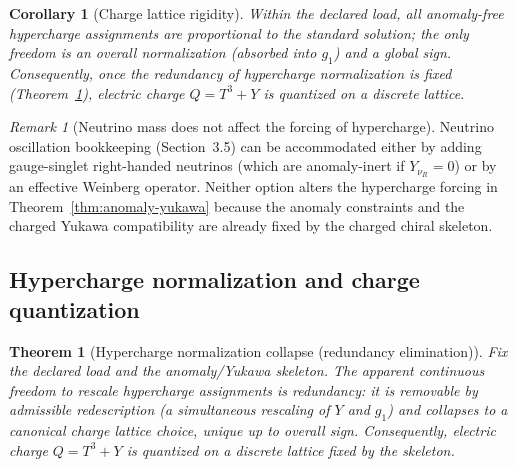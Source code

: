 \documentclass[11pt]{article}
\newtheorem{theorem}[definition]{Theorem}
\newtheorem{corollary}[definition]{Corollary}
\theoremstyle{remark}
\newtheorem{remark}[definition]{Remark}
\begin{document}
\begin{corollary}[Charge lattice rigidity]\label{cor:charge-lattice}
Within the declared load, all anomaly-free hypercharge assignments are proportional to the standard
solution; the only freedom is an overall normalization (absorbed into $g_1$) and a global sign.
Consequently, once the redundancy of hypercharge normalization is fixed (Theorem~\ref{thm:hypercharge}),
electric charge $Q=T^3+Y$ is quantized on a discrete lattice.
\end{corollary}

\begin{remark}[Neutrino mass does not affect the forcing of hypercharge]\label{rem:nu-hyper}
Neutrino oscillation bookkeeping (Section~3.5) can be accommodated either by adding gauge-singlet
right-handed neutrinos (which are anomaly-inert if $Y_{\nu_R}=0$) or by an effective Weinberg operator.
Neither option alters the hypercharge forcing in Theorem~\ref{thm:anomaly-yukawa} because the anomaly
constraints and the charged Yukawa compatibility are already fixed by the charged chiral skeleton.
\end{remark}
\subsection{Hypercharge normalization and charge quantization}

\begin{theorem}[Hypercharge normalization collapse (redundancy elimination)]\label{thm:hypercharge}
Fix the declared load and the anomaly/Yukawa skeleton.
The apparent continuous freedom to rescale hypercharge assignments is redundancy: it is removable by
admissible redescription (a simultaneous rescaling of $Y$ and $g_1$) and collapses to a canonical charge
lattice choice, unique up to overall sign.
Consequently, electric charge $Q=T^3+Y$ is quantized on a discrete lattice fixed by the skeleton.
\end{theorem}
\end{document}
